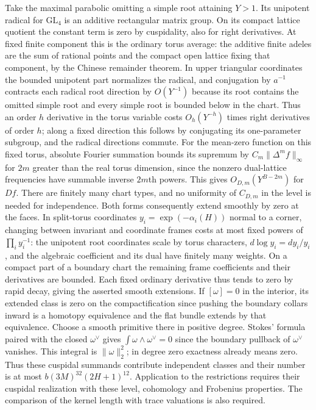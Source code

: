 \documentclass[11pt]{amsart}
\theoremstyle{definition}
\theoremstyle{remark}
\begin{document}
Take the maximal parabolic omitting a simple root attaining $Y>1$.
Its unipotent radical for $\mathrm{GL}_4$ is an additive rectangular
matrix group. On its compact lattice quotient the constant term is
zero by cuspidality, also for right derivatives. At fixed finite
component this is the ordinary torus average: the additive finite
adeles are the sum of rational points and the compact open lattice
fixing that component, by the Chinese remainder theorem. In upper
triangular coordinates the bounded unipotent part normalizes the
radical, and conjugation by $a^{-1}$ contracts each radical root
direction by $O(Y^{-1})$ because its root contains the omitted
simple root and every simple root is bounded below in the chart.
Thus an order $h$ derivative in the torus variable costs
$O_h(Y^{-h})$ times right derivatives of order $h$; along a fixed
direction this follows by conjugating its one-parameter subgroup,
and the radical directions commute. For the mean-zero function on
this fixed torus, absolute Fourier summation bounds its supremum by
$C_m\|\Delta^m f\|_\infty$ for $2m$ greater than the real torus
dimension, since the nonzero dual-lattice frequencies have summable
inverse $2m$th powers. This gives $O_{D,m}(Y^{B-2m})$ for $Df$.
There are finitely many chart types, and no uniformity of $C_{D,m}$
in the level is needed for independence. Both forms consequently
extend smoothly by zero at the faces. In split-torus coordinates
$y_i=\exp(-\alpha_i(H))$ normal to a corner, changing between
invariant and coordinate frames costs at most fixed powers of
$\prod_i y_i^{-1}$: the unipotent root coordinates scale by torus
characters, $d\log y_i=dy_i/y_i$, and the algebraic coefficient
and its dual have finitely many weights. On a compact part of a
boundary chart the remaining frame coefficients and their derivatives
are bounded. Each fixed ordinary derivative thus tends to zero by
rapid decay, giving the asserted smooth extensions.
If $[\omega]=0$ in the interior, its extended class is zero on
the compactification since pushing the boundary collars inward
is a homotopy equivalence and the flat bundle extends by that
equivalence. Choose a smooth primitive there in positive degree.
Stokes' formula paired with the closed $\omega^\vee$ gives
$\int\omega\wedge\omega^\vee=0$ since the boundary pullback
of $\omega^\vee$ vanishes. This integral is $\|\omega\|_2^2$;
in degree zero exactness already means zero. Thus these cuspidal
summands contribute independent classes and their number is at most
$b(3M)^{32}(2H+1)^{12}$. Application to the restrictions requires
their cuspidal realization with these level, cohomology and
Frobenius properties. The comparison of the kernel length with trace
valuations is also required.
\end{document}
